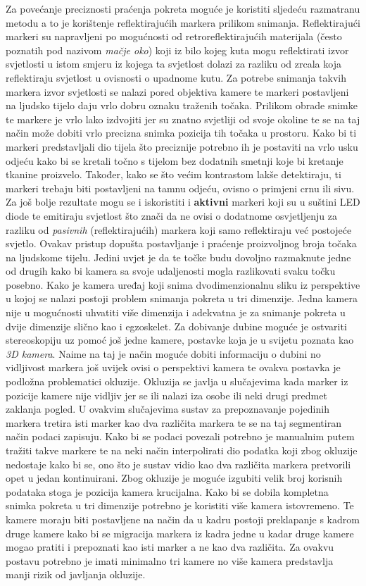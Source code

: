 \documentclass[times, utf8, diplomski]{fer}
\begin{document}
Za povećanje preciznosti praćenja pokreta moguće je koristiti sljedeću razmatranu metodu a to je korištenje reflektirajućih markera
prilikom snimanja. Reflektirajući markeri su napravljeni po mogućnosti od retroreflektirajućih materijala (često poznatih pod nazivom
\textit{mačje oko}) koji iz bilo kojeg kuta
mogu reflektirati izvor svjetlosti u istom smjeru iz kojega ta svjetlost dolazi za razliku od zrcala koja reflektiraju svjetlost u ovisnosti o
upadnome kutu. Za potrebe snimanja takvih markera izvor svjetlosti se nalazi pored objektiva kamere te markeri postavljeni na
ljudsko tijelo daju vrlo dobru oznaku traženih točaka.
Prilikom obrade snimke te markere je vrlo lako izdvojiti jer su znatno svjetliji od svoje okoline te se na taj način može dobiti
vrlo precizna snimka pozicija tih točaka u prostoru. Kako bi ti markeri predstavljali dio tijela što preciznije potrebno ih je
postaviti na vrlo usku odjeću kako bi se kretali točno s tijelom bez dodatnih smetnji koje bi kretanje tkanine proizvelo. Također,
kako se što većim kontrastom lakše detektiraju, ti markeri trebaju biti postavljeni na tamnu odjeću, ovisno o primjeni crnu ili
sivu. Za još bolje rezultate mogu
se i iskoristiti i \textbf{aktivni} markeri koji su u suštini LED diode te emitiraju svjetlost što znači da ne ovisi o dodatnome
osvjetljenju za razliku od \textit{pasivnih} (reflektirajućih) markera koji samo reflektiraju već postojeće svjetlo. Ovakav pristup dopušta
postavljanje i praćenje proizvoljnog broja točaka na ljudskome tijelu. Jedini uvjet je da te točke budu dovoljno razmaknute jedne
od drugih kako bi kamera sa svoje udaljenosti mogla razlikovati svaku točku posebno. Kako je kamera uređaj koji snima dvodimenzionalnu
sliku iz perspektive u kojoj se nalazi postoji problem snimanja pokreta u tri dimenzije. Jedna kamera nije u mogućnosti uhvatiti
više dimenzija i adekvatna je za snimanje pokreta u dvije dimenzije slično kao i egzoskelet. Za dobivanje dubine moguće je ostvariti
stereoskopiju uz pomoć još jedne kamere, postavke koja je u svijetu poznata kao \textit{3D kamera}. Naime na taj je način moguće
dobiti informaciju o dubini no vidljivost markera još uvijek ovisi o perspektivi kamera te ovakva postavka je podložna problematici
okluzije. Okluzija se javlja u slučajevima kada marker iz pozicije kamere nije vidljiv jer se ili nalazi iza osobe ili neki drugi
predmet zaklanja pogled. U ovakvim slučajevima sustav za prepoznavanje pojedinih markera tretira isti marker kao dva različita
markera te se na taj segmentiran način podaci zapisuju. Kako bi se podaci povezali potrebno je manualnim putem tražiti takve markere
te na neki način interpolirati dio podatka koji zbog okluzije nedostaje kako bi se, ono što je sustav vidio kao dva različita
markera pretvorili opet u jedan kontinuirani. Zbog okluzije je moguće izgubiti velik broj korisnih podataka stoga je pozicija
kamera krucijalna. Kako bi se dobila kompletna snimka
pokreta u tri dimenzije potrebno je koristiti više kamera istovremeno. Te kamere moraju biti postavljene na način da u kadru postoji
preklapanje s kadrom druge kamere kako bi se migracija markera iz kadra jedne u kadar druge kamere mogao pratiti i prepoznati
kao isti marker a ne kao dva različita. Za ovakvu postavu potrebno je imati minimalno tri kamere no više kamera predstavlja
manji rizik od javljanja okluzije.
\end{document}
